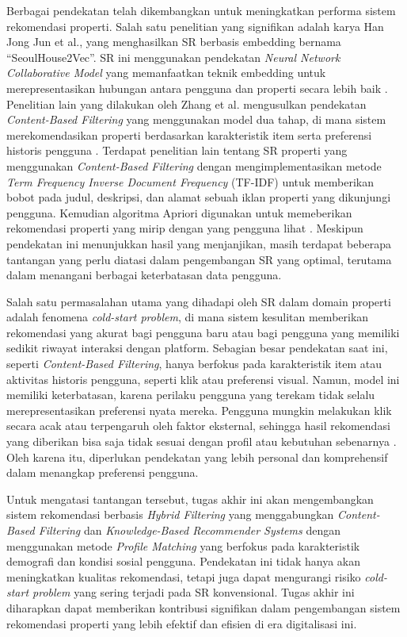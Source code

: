 Berbagai pendekatan telah dikembangkan untuk meningkatkan performa sistem rekomendasi properti. 
Salah satu penelitian yang signifikan adalah karya Han Jong Jun et al., yang menghasilkan SR berbasis embedding bernama “SeoulHouse2Vec”. 
SR ini menggunakan pendekatan \emph{Neural Network Collaborative Model} yang memanfaatkan teknik embedding untuk merepresentasikan hubungan antara pengguna dan properti secara lebih baik \parencite{Jun2020}. 
Penelitian lain yang dilakukan oleh Zhang et al. mengusulkan pendekatan \emph{Content-Based Filtering} yang menggunakan model dua tahap, di mana sistem merekomendasikan properti berdasarkan karakteristik item serta preferensi historis pengguna \parencite{Zhang2019}. 
Terdapat penelitian lain tentang SR properti yang menggunakan \emph{Content-Based Filtering} dengan mengimplementasikan metode \emph{Term Frequency Inverse Document Frequency} (TF-IDF) untuk memberikan bobot pada judul, deskripsi, dan alamat sebuah iklan properti yang dikunjungi pengguna. 
Kemudian algoritma Apriori digunakan untuk memeberikan rekomendasi properti yang mirip dengan yang pengguna lihat \parencite{Badriyah2018}. 
Meskipun pendekatan ini menunjukkan hasil yang menjanjikan, masih terdapat beberapa tantangan yang perlu diatasi dalam pengembangan SR yang optimal, terutama dalam menangani berbagai keterbatasan data pengguna.

Salah satu permasalahan utama yang dihadapi oleh SR dalam domain properti adalah fenomena \emph{cold-start problem}, di mana sistem kesulitan memberikan rekomendasi yang akurat bagi pengguna baru atau bagi pengguna yang memiliki sedikit riwayat interaksi dengan platform. 
Sebagian besar pendekatan saat ini, seperti \emph{Content-Based Filtering}, hanya berfokus pada karakteristik item atau aktivitas historis pengguna, seperti klik atau preferensi visual. 
Namun, model ini memiliki keterbatasan, karena perilaku pengguna yang terekam tidak selalu merepresentasikan preferensi nyata mereka. Pengguna mungkin melakukan klik secara acak atau terpengaruh oleh faktor eksternal, sehingga hasil rekomendasi yang diberikan bisa saja tidak sesuai dengan profil atau kebutuhan sebenarnya \parencite{KnollJulianandGro2018}. 
Oleh karena itu, diperlukan pendekatan yang lebih personal dan komprehensif dalam menangkap preferensi pengguna.

Untuk mengatasi tantangan tersebut, tugas akhir ini akan mengembangkan sistem rekomendasi berbasis \emph{Hybrid Filtering} yang menggabungkan \emph{Content-Based Filtering} dan \emph{Knowledge-Based Recommender Systems} dengan menggunakan metode \emph{Profile Matching} yang berfokus pada karakteristik demografi dan kondisi sosial pengguna. 
Pendekatan ini tidak hanya akan meningkatkan kualitas rekomendasi, tetapi juga dapat mengurangi risiko \emph{cold-start problem} yang sering terjadi pada SR konvensional. 
Tugas akhir ini diharapkan dapat memberikan kontribusi signifikan dalam pengembangan sistem rekomendasi properti yang lebih efektif dan efisien di era digitalisasi ini.

